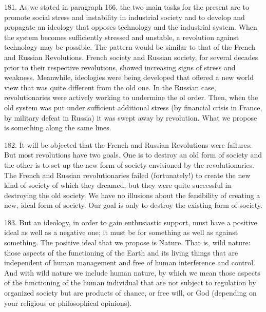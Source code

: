 \documentclass{article}
\begin{document}
181. As we stated in paragraph 166, the two main tasks for the present are to promote social stress 
and instability in industrial society and to develop and propagate an ideology that opposes 
technology and the industrial system. When the system becomes sufficiently stressed and 
unstable, a revolution against technology may be possible. The pattern would be similar to that of 
the French and Russian Revolutions. French society and Russian society, for several decades prior 
to their respective revolutions, showed increasing signs of stress and weakness. Meanwhile, 
ideologies were being developed that offered a new world view that was quite different from the 
old one. In the Russian case, revolutionaries were actively working to undermine the ol
order. Then, when the old system was put under sufficient additional stress (by financial crisis in 
France, by military defeat in Russia) it was swept away by revolution. What we propose is 
something along the same lines. \vspace{\baselineskip} \newpage

182. It will be objected that the French and Russian Revolutions were failures. But most 
revolutions have two goals. One is to destroy an old form of society and the other is to set up the 
new form of society envisioned by the revolutionaries. The French and Russian revolutionaries 
failed (fortunately!) to create the new kind of society of which they dreamed, but they were quite 
successful in destroying the old society. We have no illusions about the feasibility of creating a 
new, ideal form of society. Our goal is only to destroy the existing form of society. \vspace{\baselineskip}

183. But an ideology, in order to gain enthusiastic support, must have a positive ideal as well as a 
negative one; it must be for something as well as against something. The positive ideal that we 
propose is Nature. That is, wild nature: those aspects of the functioning of the Earth and its living 
things that are independent of human management and free of human interference and 
control. And with wild nature we include human nature, by which we mean those aspects of the 
functioning of the human individual that are not subject to regulation by organized society but are 
products of chance, or free will, or God (depending on your religious or philosophical opinions). \vspace{\baselineskip}
\end{document}
